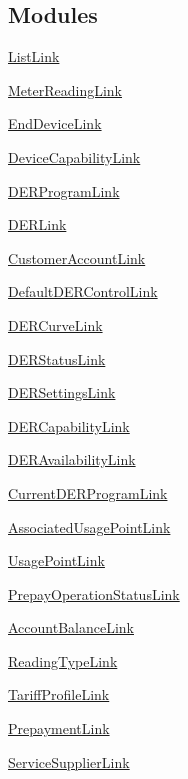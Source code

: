 \subsection*{Modules}
\begin{DoxyCompactItemize}
\item 
\hyperlink{group__ListLink}{List\+Link}
\item 
\hyperlink{group__MeterReadingLink}{Meter\+Reading\+Link}
\item 
\hyperlink{group__EndDeviceLink}{End\+Device\+Link}
\item 
\hyperlink{group__DeviceCapabilityLink}{Device\+Capability\+Link}
\item 
\hyperlink{group__DERProgramLink}{D\+E\+R\+Program\+Link}
\item 
\hyperlink{group__DERLink}{D\+E\+R\+Link}
\item 
\hyperlink{group__CustomerAccountLink}{Customer\+Account\+Link}
\item 
\hyperlink{group__DefaultDERControlLink}{Default\+D\+E\+R\+Control\+Link}
\item 
\hyperlink{group__DERCurveLink}{D\+E\+R\+Curve\+Link}
\item 
\hyperlink{group__DERStatusLink}{D\+E\+R\+Status\+Link}
\item 
\hyperlink{group__DERSettingsLink}{D\+E\+R\+Settings\+Link}
\item 
\hyperlink{group__DERCapabilityLink}{D\+E\+R\+Capability\+Link}
\item 
\hyperlink{group__DERAvailabilityLink}{D\+E\+R\+Availability\+Link}
\item 
\hyperlink{group__CurrentDERProgramLink}{Current\+D\+E\+R\+Program\+Link}
\item 
\hyperlink{group__AssociatedUsagePointLink}{Associated\+Usage\+Point\+Link}
\item 
\hyperlink{group__UsagePointLink}{Usage\+Point\+Link}
\item 
\hyperlink{group__PrepayOperationStatusLink}{Prepay\+Operation\+Status\+Link}
\item 
\hyperlink{group__AccountBalanceLink}{Account\+Balance\+Link}
\item 
\hyperlink{group__ReadingTypeLink}{Reading\+Type\+Link}
\item 
\hyperlink{group__TariffProfileLink}{Tariff\+Profile\+Link}
\item 
\hyperlink{group__PrepaymentLink}{Prepayment\+Link}
\item 
\hyperlink{group__ServiceSupplierLink}{Service\+Supplier\+Link}

\end{DoxyCompactItemize}
